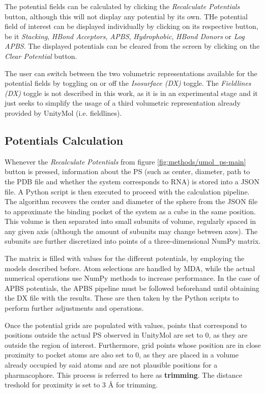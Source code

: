     The potential fields can be calculated by clicking the \textit{Recalculate Potentials} button, although this will not display any potential by its own. THe potential field of interest can be displayed individually by clicking on its respective button, be it \textit{Stacking}, \textit{HBond Acceptors}, \textit{APBS}, \textit{Hydrophobic}, \textit{HBond Donors} or \textit{Log APBS}. The displayed potentials can be cleared from the screen by clicking on the \textit{Clear Potential} button.

    The user can switch between the two volumetric representations available for the potential fields by toggling on or off the \textit{Isosurface (DX)} toggle. The \textit{Fieldlines (DX)} toggle is not described in this work, as it is in an experimental stage and it just seeks to simplify the usage of a third volumetric representation already provided by UnityMol (i.e. fieldlines).

  \subsection{Potentials Calculation}
    Whenever the \textit{Recalculate Potentials} from figure \ref{fig:methods/umol_ps-main} button is pressed, information about the PS (such as center, diameter, path to the PDB file and whether the system corresponds to RNA) is stored into a JSON file. A Python script is then executed to proceed with the calculation pipeline. The algorithm recovers the center and diameter of the sphere from the JSON file to approximate the binding pocket of the system as a cube in the same position. This volume is then separated into small subunits of volume, regularly spaced in any given axis (although the amount of subunits may change between axes). The subunits are further discretized into points of a three-dimensional NumPy matrix.

    The matrix is filled with values for the different potentials, by employing the models described before. Atom selections are handled by MDA, while the actual numerical operations use NumPy methods to increase performance. In the case of APBS potentials, the APBS pipeline must be followed beforehand until obtaining the DX file with the results. These are then taken by the Python scripts to perform further adjustments and operations.

    Once the potential grids are populated with values, points that correspond to positions outside the actual PS observed in UnityMol are set to $0$, as they are outside the region of interest. Furthermore, grid points whose position are in close proximity to pocket atoms are also set to 0, as they are placed in a volume already occupied by said atoms and are not plausible positions for a pharmacophore. This process is referred to here as \textbf{trimming}. The distance treshold for proximity is set to {3 \AA} for trimming.

